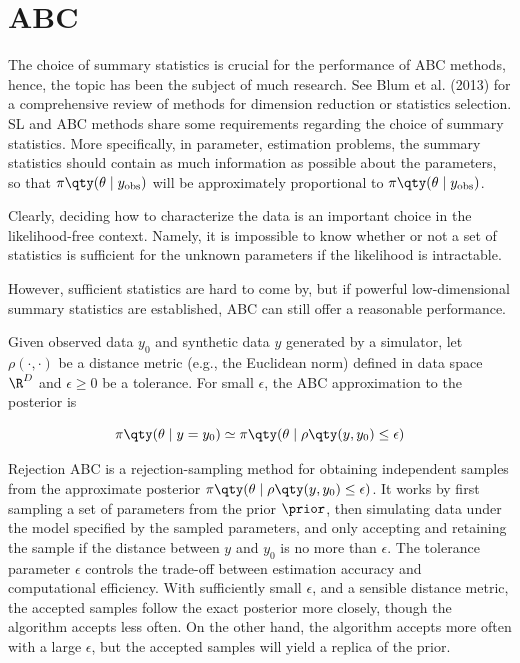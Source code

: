 \section{ABC}

The choice of summary statistics is crucial for the performance of ABC methods, hence, the topic has been the subject of much research. See Blum et al. (2013) for a comprehensive review of methods for dimension reduction or statistics selection. SL and ABC methods share some requirements regarding the choice of summary statistics. More specifically, in parameter, estimation problems, the summary statistics should contain as much information as possible about the parameters, so that $\pi \qty(\theta \mid y_\mathrm{obs})$ will be approximately proportional to $\pi \qty(\theta \mid y_\mathrm{obs})$. \cite{ABC_ch20} 


Clearly, deciding how to characterize the data is an important choice in the likelihood-free context. Namely, it is impossible to know whether or not a set of statistics is sufficient for the unknown parameters if the likelihood is intractable.

However, sufficient statistics are hard to come by, but if powerful low-dimensional summary statistics are established, ABC can still offer a reasonable performance. 

Given observed data $y_0$ and synthetic data $y$ generated by a simulator, let $\rho (\cdot, \cdot)$ be a distance metric (e.g., the Euclidean norm) defined in data space $\R^D$ and $\epsilon \geq 0$ be a tolerance. For small $\epsilon$, the ABC approximation to the posterior is 

\begin{equation}
    \pi \qty(\theta \mid y=y_0) \simeq \pi \qty(\theta \mid \rho \qty(y, y_0) \leq \epsilon)
\end{equation}


Rejection ABC is a rejection-sampling method for obtaining independent samples from the approximate posterior $ \pi \qty(\theta \mid \rho \qty(y, y_0) \leq \epsilon)$. It works by first sampling a set of parameters from the prior $\prior$, then simulating data under the model specified by the sampled parameters, and only accepting and retaining the sample if the distance between $y$ and $y_0$ is no more than $\epsilon$. The tolerance parameter $\epsilon$ controls the trade-off between estimation accuracy and computational efficiency. With sufficiently small $\epsilon$, and a sensible distance metric, the accepted samples follow the exact posterior more closely, though the algorithm accepts less often. On the other hand, the algorithm accepts more often with a large $\epsilon$, but the accepted samples will yield a replica of the prior.

